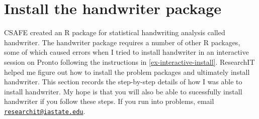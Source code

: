 \documentclass[
]{book}
\begin{document}
\hypertarget{install-the-handwriter-package}{%
\section{Install the handwriter package}\label{install-the-handwriter-package}}

CSAFE created an R package for statistical handwriting analysis called handwriter. The handwriter package requires a number of other R packages, some of which caused errors when I tried to install handwriter in an interactive session on Pronto following the instructions in \ref{ex-interactive-install}. ResearchIT helped me figure out how to install the problem packages and ultimately install handwriter. This section records the step-by-step details of how I was able to install handwriter. My hope is that you will also be able to sucessfully install handwriter if you follow these steps. If you run into problems, email \href{mailto:researchit@iastate.edu}{\nolinkurl{researchit@iastate.edu}}.
\end{document}
